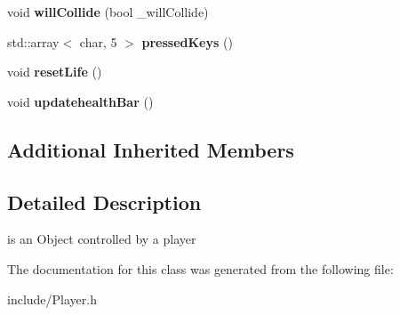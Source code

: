 \begin{DoxyCompactItemize}
\item 
void {\bfseries will\+Collide} (bool \+\_\+will\+Collide)\hypertarget{classPlayer_a75fc22bdb8f6857f181eb85cc07efcc2}{}\label{classPlayer_a75fc22bdb8f6857f181eb85cc07efcc2}

\item 
std\+::array$<$ char, 5 $>$ {\bfseries pressed\+Keys} ()\hypertarget{classPlayer_ae0c6fe41ad92fc72437b38fe97422a58}{}\label{classPlayer_ae0c6fe41ad92fc72437b38fe97422a58}

\item 
void {\bfseries reset\+Life} ()\hypertarget{classPlayer_a2cd88e83a7839a42d68fb9f6965cc8a2}{}\label{classPlayer_a2cd88e83a7839a42d68fb9f6965cc8a2}

\item 
void {\bfseries updatehealth\+Bar} ()\hypertarget{classPlayer_a2b19a4da34d0b64209b617107c4d4ce7}{}\label{classPlayer_a2b19a4da34d0b64209b617107c4d4ce7}

\end{DoxyCompactItemize}
\subsection*{Additional Inherited Members}


\subsection{Detailed Description}
is an Object controlled by a player 

The documentation for this class was generated from the following file\+:\begin{DoxyCompactItemize}
\item 
include/Player.\+h\end{DoxyCompactItemize}
